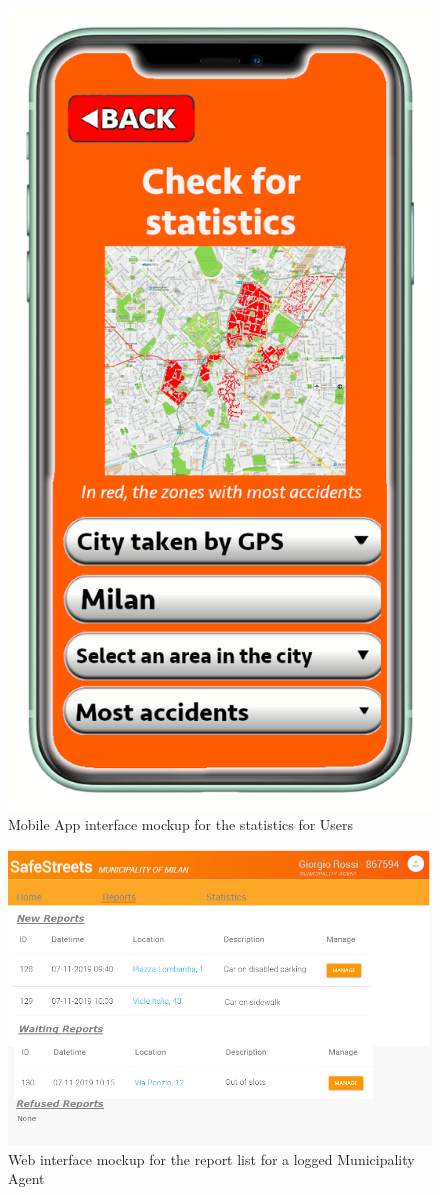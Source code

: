 \documentclass[a4paper]{report}
\begin{document}
\begin{figure}
\begin{minipage}{.45\textwidth}
\includegraphics[width=.7\linewidth]{mockups/Checkstatistics.png}
\caption[Mobile App mockup for statistics]{Mobile App interface mockup for the statistics for Users}
\label{fig:check-statistics}
\end{minipage}
\end{figure}
\begin{figure}[htp]
\centering
\includegraphics[width= \textwidth]{mockups/homeReport.png}
\caption[Web mockup for reports page]{Web interface mockup for the report list for a logged Municipality Agent }
\label{fig:mock-webreports}
\end{figure}
\end{document}
